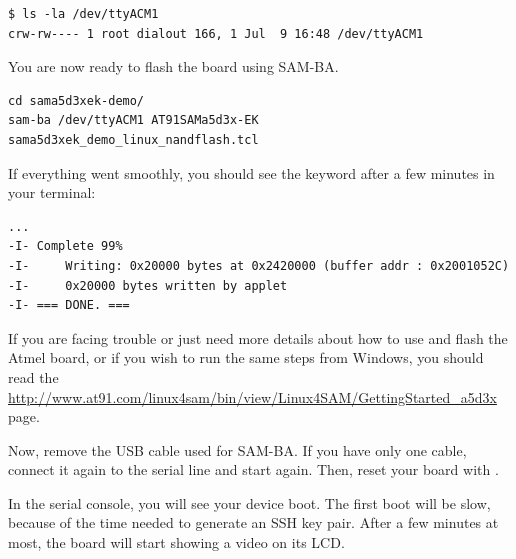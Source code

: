 \begin{verbatim}
$ ls -la /dev/ttyACM1
crw-rw---- 1 root dialout 166, 1 Jul  9 16:48 /dev/ttyACM1
\end{verbatim}

You are now ready to flash the board using SAM-BA.

\begin{verbatim}
cd sama5d3xek-demo/
sam-ba /dev/ttyACM1 AT91SAMa5d3x-EK sama5d3xek_demo_linux_nandflash.tcl
\end{verbatim}

If everything went smoothly, you should see the  keyword
after a few minutes in your terminal:

\begin{verbatim}
...
-I- Complete 99%
-I- 	Writing: 0x20000 bytes at 0x2420000 (buffer addr : 0x2001052C)
-I- 	0x20000 bytes written by applet
-I- === DONE. ===
\end{verbatim}

If you are facing trouble or just need more details about how to use and
flash the Atmel board, or if you wish to run the same steps from
Windows, you should read the
\url{http://www.at91.com/linux4sam/bin/view/Linux4SAM/GettingStarted_a5d3x}
page.

Now, remove the USB cable used for SAM-BA. If you have only one cable,
connect it again to the serial line and start  again.
Then, reset your board with .

In the serial console, you will see your device boot. The first boot
will be slow, because of the time needed to generate an SSH key pair.
After a few minutes at most, the board will start showing a video on
its LCD.
